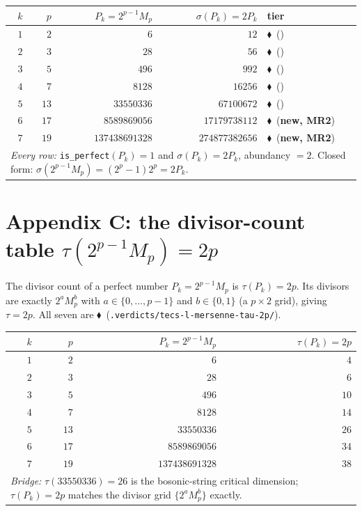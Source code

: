 \documentclass[11pt,a4paper]{article}
\newcommand{\tierF}{\textcolor{blue!60!black}{$\blacklozenge$}}   %
\newcommand{\sig}{\sigma}
\newcommand{\Mp}{M_p}
\theoremstyle{definition}
\begin{document}
\begin{center}
\begin{longtable}{rrrrl}
\toprule
$k$ & $p$ & $P_k = 2^{p-1}\Mp$ & $\sig(P_k) = 2P_k$ & tier \\
\midrule
\endhead
$1$ & $2$  & $6$            & $12$             & \tierF\ (\citep{tecs-l-locus}) \\
$2$ & $3$  & $28$           & $56$             & \tierF\ (\citep{tecs-l-locus}) \\
$3$ & $5$  & $496$          & $992$            & \tierF\ (\citep{tecs-l-locus}) \\
$4$ & $7$  & $8128$         & $16256$          & \tierF\ (\citep{tecs-l-locus}) \\
$5$ & $13$ & $33550336$     & $67100672$       & \tierF\ (\citep{tecs-l-locus}) \\
$6$ & $17$ & $8589869056$   & $17179738112$    & \tierF\ (\textbf{new, MR2}) \\
$7$ & $19$ & $137438691328$ & $274877382656$   & \tierF\ (\textbf{new, MR2}) \\
\midrule
\multicolumn{5}{l}{\emph{Every row:} \texttt{is\_perfect}$(P_k)=1$ and
$\sig(P_k)=2P_k$, abundancy $=2$. Closed form: $\sig(2^{p-1}\Mp)=(2^p-1)2^p=2P_k$.}\\
\bottomrule
\end{longtable}
\end{center}

\section{Appendix C: the divisor-count table $\tau(2^{p-1}\Mp)=2p$}
\label{app:tau-table}

The divisor count of a perfect number $P_k = 2^{p-1}\Mp$ is $\tau(P_k)=2p$. Its
divisors are exactly $2^a \Mp^b$ with $a\in\{0,\dots,p-1\}$ and $b\in\{0,1\}$ (a
$p\times 2$ grid), giving $\tau = 2p$. All seven are \tierF\
(\texttt{.verdicts/tecs-l-mersenne-tau-2p/}).

\begin{center}
\begin{longtable}{rrrr}
\toprule
$k$ & $p$ & $P_k = 2^{p-1}\Mp$ & $\tau(P_k) = 2p$ \\
\midrule
\endhead
$1$ & $2$  & $6$            & $4$  \\
$2$ & $3$  & $28$           & $6$  \\
$3$ & $5$  & $496$          & $10$ \\
$4$ & $7$  & $8128$         & $14$ \\
$5$ & $13$ & $33550336$     & $26$ \\
$6$ & $17$ & $8589869056$   & $34$ \\
$7$ & $19$ & $137438691328$ & $38$ \\
\midrule
\multicolumn{4}{l}{\emph{Bridge:} $\tau(33550336)=26$ is the bosonic-string critical
dimension; $\tau(P_k)=2p$ matches the divisor grid $\{2^a\Mp^b\}$ exactly.}\\
\bottomrule
\end{longtable}
\end{center}
\end{document}
